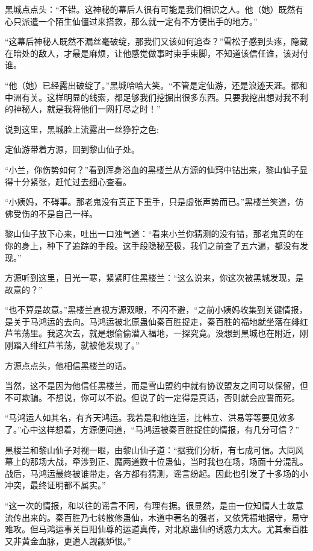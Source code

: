 \begin{this_body}
黑城点点头：“不错。这神秘的幕后人很有可能是我们相识之人。他（她）既然有心只派遣一个陌生仙僵过来搭救，那么就一定有不方便出手的地方。”

“这幕后神秘人既然不漏丝毫破绽，那我们又该如何追查？”雪松子感到头疼，隐藏在暗处的敌人，才最是麻烦，让他感觉做事时束手束脚，不知道该信任谁，该对付谁。

“他（她）已经露出破绽了。”黑城哈哈大笑。“不管是定仙游，还是浪迹天涯。都和中洲有关。这样明显的线索，都足够我们挖掘出很多东西。只要我挖出想对我不利的神秘人，就是我将他们一网打尽之时！”

说到这里，黑城脸上流露出一丝狰狞之色;

定仙游带着方源，回到黎山仙子处。

“小兰，你伤势如何？”看到浑身浴血的黑楼兰从方源的仙窍中钻出来，黎山仙子显得十分紧张，赶忙过去细心查看。

“小姨妈，不碍事。那老鬼没有真正下重手，只是虚张声势而已。”黑楼兰笑道，仿佛受伤的不是自己一样。

黎山仙子放下心来，吐出一口浊气道：“看来小兰你猜测的没有错，那老鬼真的在你的身上，种下了追踪的手段。这手段隐秘至极，我们之前查了五六遍，都没有发现。”

方源听到这里，目光一寒，紧紧盯住黑楼兰：“这么说来，你这次被黑城发现，是故意的？”

“也不算是故意。”黑楼兰直视方源双眼，不闪不避，“之前小姨妈收集到关键情报，是关于马鸿运的去向。马鸿运被北原蛊仙秦百胜捉走，秦百胜的福地就坐落在绯红芦苇荡里。我这次去，就是想偷偷潜入福地，一探究竟。没想到黑城也在附近，刚刚踏入绯红芦苇荡，就被他发现了。”

方源点点头，他相信黑楼兰的话。

当然，这不是因为他信任黑楼兰，而是雪山盟约中就有协议盟友之间可以保留，但不可欺骗。不想说，你可以不说。但说了的一定得是真话，否则就会应誓而死。

“马鸿运人如其名，有齐天鸿运。我若是和他连运，比韩立、洪易等等要见效多了。”心中这样想着，方源便问道，“马鸿运被秦百胜捉住的情报，有几分可信？”

黑楼兰和黎山仙子对视一眼，由黎山仙子道：“据我们分析，有七成可信。大同风幕上的那场大战，牵涉到正、魔两道数十位蛊仙，当时我也在场，场面十分混乱。战后，马鸿运最终被谁带走，各方都有猜测，谣言纷起。因此也引发了十多场的小冲突，最终证明都不属实。”

“这一次的情报，和以往的谣言不同，有理有据。很显然，是由一位知情人士故意流传出来的。秦百胜乃七转散修蛊仙，木道中著名的强者，又依凭福地据守，易守难攻。但马鸿运事关巨阳仙尊的运道真传，对北原蛊仙的诱惑力太大。尤其秦百胜又非黄金血脉，更遭人觊觎妒恨。”


\end{this_body}
